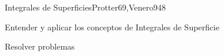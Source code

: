 \begin{syllabus}
\begin{unit}{Integrales de Superficies}{Protter69,Venero94}{8}
   \begin{learningoutcomes}
         \item  Entender y aplicar los conceptos de Integrales de Superficie
         \item  Resolver problemas
   \end{learningoutcomes}
\end{unit}

\begin{coursebibliography}
\end{coursebibliography}

\end{syllabus}
